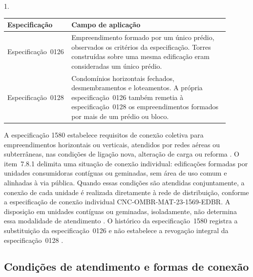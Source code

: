 \par\smallskip\noindent
\begin{minipage}{\linewidth}
  \centering
  \begin{Spacing}{1.}
    \label{qua:escopo-0126-0128}
  \end{Spacing}
  \vspace{0.7\baselineskip}
  {\small
  \renewcommand{\arraystretch}{1.2}
  \setlength{\tabcolsep}{4pt}
  \begin{tabular}{|>{\raggedright\arraybackslash}p{0.20\linewidth}|>{\raggedright\arraybackslash}p{0.70\linewidth}|}
    \hline
    \textbf{Especificação} & \textbf{Campo de aplicação} \\\hline
    Especificação~0126 & Empreendimento formado por um único prédio, observados os critérios da especificação. Torres construídas sobre uma mesma edificação eram consideradas um único prédio. \\\hline
    Especificação~0128 & Condomínios horizontais fechados, desmembramentos e loteamentos. A própria especificação~0126 também remetia à especificação~0128 os empreendimentos formados por mais de um prédio ou bloco. \\\hline
  \end{tabular}}
\end{minipage}\par\smallskip

A especificação 1580 estabelece requisitos de conexão coletiva para empreendimentos horizontais ou verticais, atendidos por redes aéreas ou subterrâneas, nas condições de ligação nova, alteração de carga ou reforma \cite[seção~1]{enel1580}. O item~7.8.1 delimita uma situação de conexão individual: edificações formadas por unidades consumidoras contíguas ou geminadas, sem área de uso comum e alinhadas à via pública. Quando essas condições são atendidas conjuntamente, a conexão de cada unidade é realizada diretamente à rede de distribuição, conforme a especificação de conexão individual CNC-OMBR-MAT-23-1569-EDBR. A disposição em unidades contíguas ou geminadas, isoladamente, não determina essa modalidade de atendimento \cite[item~7.8.1]{enel1580}. O histórico da especificação~1580 registra a substituição da especificação~0126 e não estabelece a revogação integral da especificação~0128 \cite[seção~2]{enel1580}.

\subsection{Condições de atendimento e formas de conexão}

